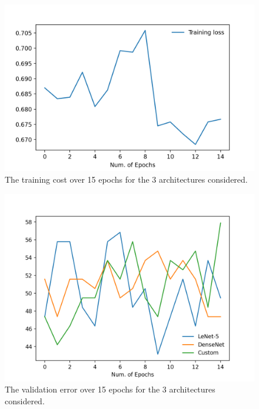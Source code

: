 \documentclass[manuscript,screen,review]{acmart}
\begin{document}
\begin{figure}[h]
  \centering
  \includegraphics[width=\linewidth]{../presentation/training_cost.png}
  \caption{The training cost over 15 epochs for the 3 architectures considered.}
  \label{fig:train}
\end{figure}




\begin{figure}[h]
  \centering
  \includegraphics[width=\linewidth]{../presentation/validation_error.png}
  \caption{The validation error over 15 epochs for the 3 architectures considered.}
  \label{fig:valid}
\end{figure}
\end{document}
